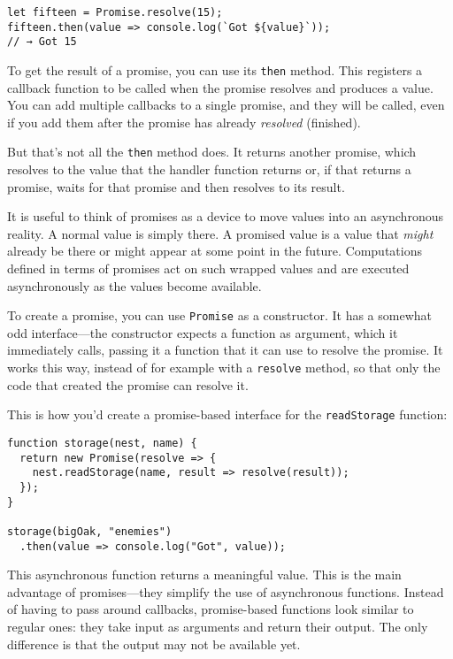 \begin{lstlisting}
let fifteen = Promise.resolve(15);
fifteen.then(value => console.log(`Got ${value}`));
// → Got 15
\end{lstlisting}
\noindent{}

To get the result of a promise, you can use its \lstinline`then` method. This registers a callback function to be called when the promise resolves and produces a value. You can add multiple callbacks to a single promise, and they will be called, even if you add them after the promise has already \emph{resolved} (finished).

But that's not all the \lstinline`then` method does. It returns another promise, which resolves to the value that the handler function returns or, if that returns a promise, waits for that promise and then resolves to its result.

It is useful to think of promises as a device to move values into an asynchronous reality. A normal value is simply there. A promised value is a value that \emph{might} already be there or might appear at some point in the future. Computations defined in terms of promises act on such wrapped values and are executed asynchronously as the values become available.

To create a promise, you can use \lstinline`Promise` as a constructor. It has a somewhat odd interface—the constructor expects a function as argument, which it immediately calls, passing it a function that it can use to resolve the promise. It works this way, instead of for example with a \lstinline`resolve` method, so that only the code that created the promise can resolve it.

This is how you'd create a promise-based interface for the \lstinline`readStorage` function:

\begin{lstlisting}
function storage(nest, name) {
  return new Promise(resolve => {
    nest.readStorage(name, result => resolve(result));
  });
}

storage(bigOak, "enemies")
  .then(value => console.log("Got", value));
\end{lstlisting}
\noindent

This asynchronous function returns a meaningful value. This is the main advantage of promises—they simplify the use of asynchronous functions. Instead of having to pass around callbacks, promise-based functions look similar to regular ones: they take input as arguments and return their output. The only difference is that the output may not be available yet.

